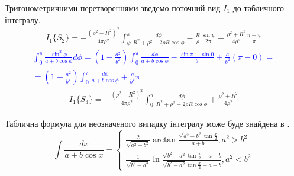 Тригонометричними перетвореннями зведемо поточний вид $ I_1 $ до табличного 
інтегралу.
%
\begin{equation*} \begin{aligned}
I_{1} \{ S_2 \} = - \frac{\left( \rho^2 - R^2 \right)^2}{4 \pi \rho^2} 
\int_{\psi}^{\pi} \frac{d \phi}{R^2 + \rho^2 - 2 \rho R \cos \phi} - 
\frac{R}{\rho} \frac{\sin \psi}{2 \pi} +  
\frac{\rho^2 + R^2}{4 \rho^2} \frac{\pi - \psi}{\pi}
\end{aligned} \end{equation*}
%
\textcolor{blue}{ \begin{equation*} \begin{aligned}
\int_{0}^{\pi} \frac{\sin^2{\phi}}{a + b \cos \phi} d \phi =  
\left( 1 - \frac{a^2}{b^2} \right)
\int_{0}^{\pi} \frac{d \phi}{a + b \cos \phi} -
\frac{\sin \pi - \sin 0}{b} + \frac{a}{b^2} (\pi - 0) = \\
= \left( 1 - \frac{a^2}{b^2} \right)
\int_{0}^{\pi} \frac{d \phi}{a + b \cos \phi} +
\frac{a}{b^2} \pi
\end{aligned} \end{equation*} }
%
\begin{equation*} \begin{aligned}
I_{1} \{ S_3 \} = - \frac{\left( \rho^2 - R^2 \right)^2}{4 \pi \rho^2} 
\int_{0}^{\pi} \frac{d \phi}{R^2 + \rho^2 - 2 \rho R \cos \phi} + 
\frac{\rho^2 + R^2}{4 \rho^2}
\end{aligned} \end{equation*}

Таблична формула для неозначеного випадку інтегралу може буде знайдена в 
\cite[ст. 181]{imp:ElementFunc1983}.
%
\begin{equation} \label{eq:caseTableIntegral}
\int \frac{d x}{a + b \cos{x}} = \begin{cases}
\frac{2}{\sqrt{a^2-b^2}} \arctan \frac{\sqrt{a^2-b^2} \tan \frac{x}{2}}
{a + b}, a^2 > b^2 \\
\frac{1}{\sqrt{b^2-a^2}} \ln 
\frac{\sqrt{b^2-a^2} \tan \frac{x}{2} + a + b}
{\sqrt{b^2-a^2} \tan \frac{x}{2} - a - b}, a^2 < b^2
\end{cases}
\end{equation}

